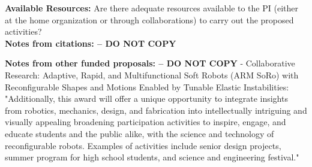 \documentclass[12pt]{article}
\begin{document}
\noindent
\textbf{Available Resources:} Are there adequate resources available to the PI (either at the home organization or through collaborations) to carry out the proposed activities?\\




\noindent
\textbf{Notes from citations: -- DO NOT COPY}

\noindent
\textbf{Notes from other funded proposals: -- DO NOT COPY}
- Collaborative Research: Adaptive, Rapid, and Multifunctional Soft Robots (ARM SoRo) with Reconfigurable Shapes and Motions Enabled by Tunable Elastic Instabilities: "Additionally, this award will offer a unique opportunity to integrate insights from robotics, mechanics, design, and fabrication into intellectually intriguing and visually appealing broadening participation activities to inspire, engage, and educate students and the public alike, with the science and technology of reconfigurable robots. Examples of activities include senior design projects, summer program for high school students, and science and engineering festival."








\footnotesize
{}
\renewcommand{\thepage} {E--\arabic{page}}



\end{document}
